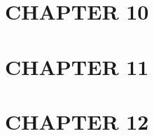 \chapter{CHAPTER 10}


\chapter{CHAPTER 11}


\chapter{CHAPTER 12}


\cite{cherokeeNationDownloads}
